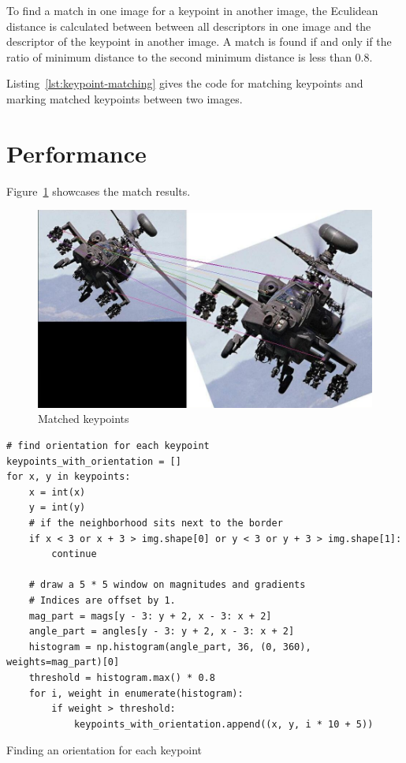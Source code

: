 \documentclass{ee208report}
\begin{document}
\begin{multicols*}{2}
To find a match in one image for a keypoint in another image, the Eculidean distance is calculated between between all descriptors in one image and the descriptor of the keypoint in another image. A match is found if and only if the ratio of minimum distance to the second minimum distance is less than 0.8.

Listing~\ref{lst:keypoint-matching} gives the code for matching keypoints and marking matched keypoints between two images.

\section{Performance}

Figure~\ref{fig:match-results} showcases the match results.

\begin{figure}[H]
    \includegraphics[width=\linewidth]{images/match_results.jpg}
    \caption{Matched keypoints}
    \label{fig:match-results}
\end{figure}




\end{multicols*}

\begin{listing}
    \begin{verbatim}
# find orientation for each keypoint
keypoints_with_orientation = []
for x, y in keypoints:
    x = int(x)
    y = int(y)
    # if the neighborhood sits next to the border
    if x < 3 or x + 3 > img.shape[0] or y < 3 or y + 3 > img.shape[1]:
        continue

    # draw a 5 * 5 window on magnitudes and gradients
    # Indices are offset by 1.
    mag_part = mags[y - 3: y + 2, x - 3: x + 2]
    angle_part = angles[y - 3: y + 2, x - 3: x + 2]
    histogram = np.histogram(angle_part, 36, (0, 360), weights=mag_part)[0]
    threshold = histogram.max() * 0.8
    for i, weight in enumerate(histogram):
        if weight > threshold:
            keypoints_with_orientation.append((x, y, i * 10 + 5))
    \end{verbatim}
    \caption{Finding an orientation for each keypoint}
    \label{lst:keypoint-orientation}
\end{listing}
\end{document}
